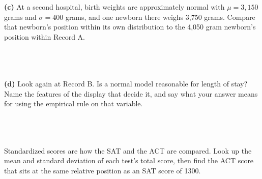\begin{enumerate}[leftmargin=1.9em, itemsep=0.16in, resume]
        \boxguard[17]
        \vspace{6pt}
        \textbf{(c)} At a second hospital, birth weights are approximately normal with
        $\mu = 3{,}150$ grams and $\sigma = 400$ grams, and one newborn there weighs 3,750 grams.
        Compare that newborn's position within its own distribution to the 4,050 gram newborn's
        position within Record A.\\[4pt]
        \\[1pt]
        \\[1pt]
        \\

        \boxguard[17]
        \vspace{6pt}
        \textbf{(d)} Look again at Record B. Is a normal model reasonable for length of stay?
        Name the features of the display that decide it, and say what your answer means for using
        the empirical rule on that variable.\\[4pt]
        \\[1pt]
        \\[1pt]
        \\

\end{enumerate}

\vspace{0.12in}

\boxguard[12]
\begin{extensionbox}
\small
Standardized scores are how the SAT and the ACT are compared. Look up the mean and standard
deviation of each test's total score, then find the ACT score that sits at the same relative
position as an SAT score of 1300.\\[4pt]
\\[1pt]
\end{extensionbox}

\vspace{0.12in}



